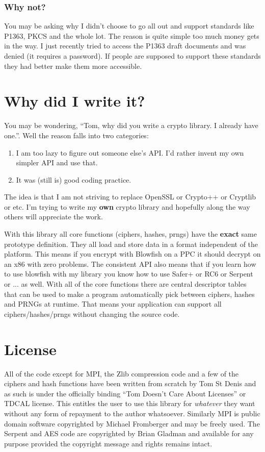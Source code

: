 \documentclass{book}
\begin{document}
\subsubsection{Why not?}
You may be asking why I didn't choose to go all out and support standards like P1363, PKCS and the whole lot.  The reason
is quite simple too much money gets in the way.  I just recently tried to access the P1363 draft documents and was denied (it 
requires a password).  If people are supposed to support these standards they had better make them more accessible.

\section{Why did I write it?}
You may be wondering, ``Tom, why did you write a crypto library.  I already have one.''.  Well the reason falls into
two categories:
\begin{enumerate}
    \item I am too lazy to figure out someone else's API.  I'd rather invent my own simpler API and use that.
    \item It was (still is) good coding practice.
\end{enumerate}

The idea is that I am not striving to replace OpenSSL or Crypto++ or Cryptlib or etc.  I'm trying to write my 
{\bf own} crypto library and hopefully along the way others will appreciate the work.

With this library all core functions (ciphers, hashes, prngs) have the {\bf exact} same prototype definition.  They all load
and store data in a format independent of the platform.  This means if you encrypt with Blowfish on a PPC it should decrypt
on an x86 with zero problems.  The consistent API also means that if you learn how to use blowfish with my library you 
know how to use Safer+ or RC6 or Serpent or ... as well.  With all of the core functions there are central descriptor tables 
that can be used to make a program automatically pick between ciphers, hashes and PRNGs at runtime.  That means your 
application can support all ciphers/hashes/prngs without changing the source code.

\section{License}

All of the code except for MPI, the Zlib compression code and a few of the ciphers and hash functions have been written 
from scratch by Tom St Denis and as such is under the officially binding ``Tom Doesn't Care About Licenses'' or TDCAL 
license.  This entitles the user to use this library for {\em whatever} they want without any form of repayment to 
the author whatsoever.  Similarly MPI is public domain software copyrighted by Michael Fromberger and may be freely 
used.  The Serpent and AES code are copyrighted by Brian Gladman and available for any purpose provided the 
copyright message and rights remains intact.
\end{document}
